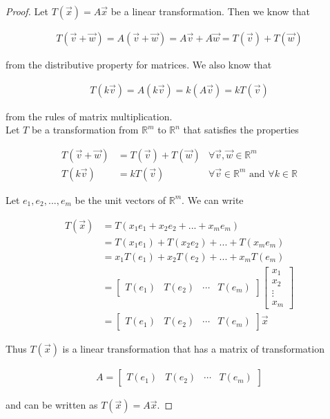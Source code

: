 \documentclass{article}
\begin{document}
\begin{proof}
Let $T(\vec{x}) = A\vec{x}$ be a linear transformation. Then we know that 
 
\begin{align*}
T(\vec{v} + \vec{w}) = A(\vec{v} + \vec{w}) = A\vec{v} + A\vec{w} = T(\vec{v}) + T(\vec{w})
\end{align*}

from the distributive property for matrices. We also know that 

\begin{align*}
T(k \vec{v}) = A(k \vec{v}) = k(A\vec{v}) = k T(\vec{v})
\end{align*}

from the rules of matrix multiplication. \\

Let $T$ be a transformation from $\mathbb{R}^m$ to $\mathbb{R}^n$ that satisfies the properties

\begin{align*}
T(\vec{v} + \vec{w}) &= T(\vec{v}) + T(\vec{w}) & \forall \vec{v}, \vec{w} \in \mathbb{R}^m \\
T(k\vec{v}) &= kT(\vec{v})  & \forall \vec{v} \in \mathbb{R}^m \textrm{ and } \forall k \in \mathbb{R}
\end{align*}

Let $e_{1},e_{2},...,e_{m}$ be the unit vectors of $\mathbb{R}^m$. We can write

\begin{align*}
T(\vec{x}) &= T(x_{1} e_{1} + x_{2} e_{2} + ... + x_{m} e_{m}) \\
&= T(x_{1} e_{1}) + T(x_{2} e_{2}) + ... + T(x_{m} e_{m}) \\
&= x_{1} T(e_{1}) + x_{2} T(e_{2}) + ... + x_{m} T(e_{m}) \\
&= \begin{bmatrix} T(e_{1}) & T(e_{2}) & \cdots & T(e_{m}) \end{bmatrix} \begin{bmatrix} x_{1} \\ x_{2} \\ \vdots \\ x_{m} \end{bmatrix} \\
&= \begin{bmatrix} T(e_{1}) & T(e_{2}) & \cdots & T(e_{m}) \end{bmatrix} \vec{x}
\end{align*}

Thus $T(\vec{x})$ is a linear transformation that has a matrix of transformation 

\begin{align*}
A = \begin{bmatrix} T(e_{1}) & T(e_{2}) & \cdots & T(e_{m}) \end{bmatrix}
\end{align*}

and can be written as $T(\vec{x}) = A\vec{x}$.
\end{proof}
\end{document}
